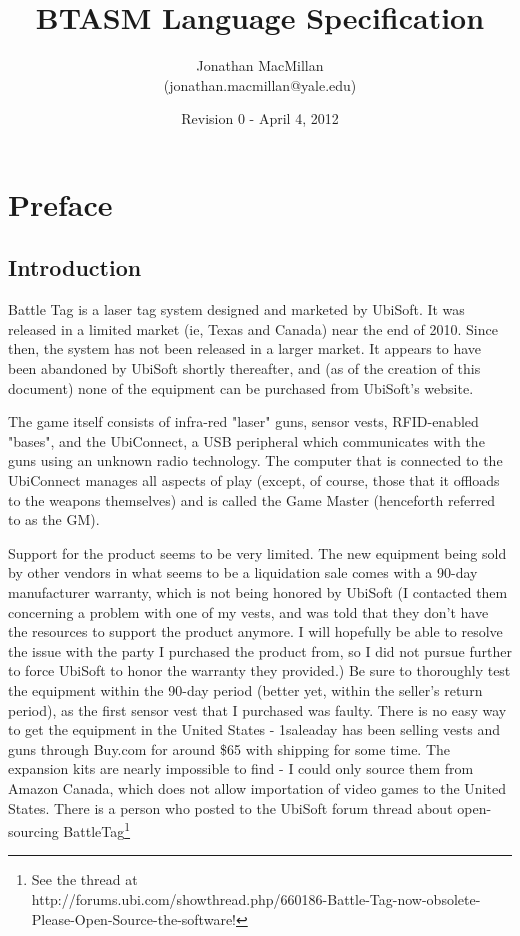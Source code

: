 \documentclass[12pt,a4paper]{scrbook}
\begin{document}
\title {BTASM Language Specification}
\date {Revision 0 - April 4, 2012}
\author {Jonathan MacMillan \\(jonathan.macmillan@yale.edu)}
\maketitle

\frontmatter
\setcounter{page}{1}
\tableofcontents


\chapter*{Preface}
\pagestyle{scrheadings}
\rohead{\thepage}
\lehead{\thepage}
\cfoot{}
\ofoot{}
\section*{Introduction}

Battle Tag is a laser tag system designed and marketed by UbiSoft.  It was released in a
limited market (ie, Texas and Canada) near the end of 2010.  Since then, the system has
not been released in a larger market.  It appears to have been abandoned by UbiSoft shortly
thereafter, and (as of the creation of this document) none of the equipment can be purchased
from UbiSoft's website.

The game itself consists of infra-red "laser" guns, sensor vests, RFID-enabled "bases", and
the UbiConnect, a USB peripheral which communicates with the guns using an unknown radio
technology.  The computer that is connected to the UbiConnect manages all aspects of play 
(except, of course, those that it offloads to the weapons themselves) and is called the Game
Master (henceforth referred to as the GM).

Support for the product seems to be very limited.  The new equipment being sold by other
vendors in what seems to be a liquidation sale comes with a 90-day manufacturer warranty, 
which is not being honored by UbiSoft (I contacted them concerning a problem with one of my vests, 
and was told that they don't have the resources to support the product anymore.  I will hopefully be
able to resolve the issue with the party I purchased the product from, so I did not pursue further to
force UbiSoft to honor the warranty they provided.)  Be sure to thoroughly test the
equipment within the 90-day period (better yet, within the seller's return period), as the first
 sensor vest that I purchased was faulty.
There is no easy way to get the equipment in the United States - 1saleaday has been selling
vests and guns through Buy.com  for around \$65 with shipping for some time.  The expansion kits are
 nearly impossible to find - I could only source them from Amazon Canada, which does not allow 
 importation of video games to the United States.  There is a person who posted to the UbiSoft forum
 thread about open-sourcing BattleTag\footnote{See the thread at \\
 http://forums.ubi.com/showthread.php/660186-Battle-Tag-now-obsolete-Please-Open-Source-the-software!}
\end{document}
